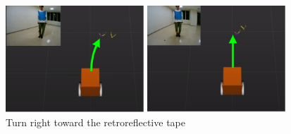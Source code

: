\begin{figure}[h]
  \centering
  \begin{minipage}[c]{65mm} 
      \centering
      \includegraphics[height=40mm]{images/RobotGuidance_learning_turn_right_(a).png}
  \end{minipage}
  \begin{minipage}[c]{65mm} 
      \centering
      \includegraphics[height=40mm]{images/RobotGuidance_learning_turn_right_(b).png}
  \end{minipage}
  \caption{Turn right toward the retroreflective tape}
  \label{Fig:RobotGuidance_learning_turn_right}
\end{figure}

\newpage
